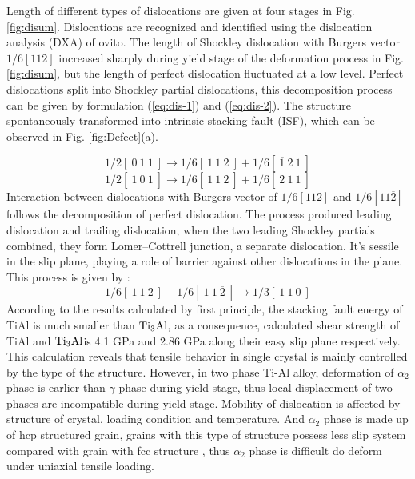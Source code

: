 \documentclass[materials,article,submit,moreauthors,pdftex,10pt,a4paper]{Definitions/mdpi}
\begin{document}
Length of different types of dislocations are given at four stages in Fig. \ref{fig:disum}. Dislocations are recognized and identified using the dislocation analysis (DXA) of ovito. The length of Shockley dislocation with Burgers vector $1/6[1 1 2]$ increased sharply during yield stage of the deformation process in Fig. \ref{fig:disum}, but the length of perfect dislocation fluctuated at a low level. Perfect  dislocations split into Shockley partial dislocations, this decomposition process  can be given by formulation (\ref{eq:dis-1}) and (\ref{eq:dis-2}). The structure spontaneously transformed into intrinsic stacking fault (ISF), which can be observed in Fig. \ref{fig:Defect}(a). 


\begin{equation}\label{eq:dis-1}
1/2 [\ 0\ 1\ 1\ ] \to 1/6[\ 1\ 1\ 2\ ]+1/6[\ \overline{1}\ 2\ 1\ ]
\end{equation}
\begin{equation}\label{eq:dis-2}
1/2 [\ 1\ 0\ \overline{1}\ ] \to 1/6 [\ 1\ 1\ \overline{2}\ ] + 1/6[\ 2\ \overline{1}\ \overline{1}\ ]
\end{equation}
Interaction between dislocations with Burgers vector of $1/6 [112] $ and $ 1/6 [11\overline{2}]$ follows the decomposition of perfect dislocation. The process produced leading dislocation and trailing dislocation, when the two leading Shockley partials combined, they form Lomer–Cottrell junction, a separate dislocation. It's sessile in the slip plane, playing a role of barrier against other dislocations in the plane. This process is given by :
\begin{equation}\label{eq:dis-3}
1/6 [\ 1\ 1\ 2\ ] + 1/6 [\ 1\ 1\  \overline{2}\ ] \to 1/3 [\ 1\ 1\ 0\ ]
\end{equation}
According to the  results calculated by first principle, the stacking fault energy of TiAl is much smaller than $\rm{Ti_3Al}$, as a consequence, calculated shear strength of TiAl and $\rm{Ti_3Al}$is 4.1 GPa and 2.86 GPa along their easy slip plane respectively\cite{Liu2007}. This calculation reveals that tensile behavior in single crystal is mainly controlled by the type of the structure. However, in two phase Ti-Al alloy, deformation of $\alpha_2$ phase is earlier than $\gamma$ phase during yield stage, thus local displacement of two phases are incompatible during yield stage.  Mobility of dislocation is affected by structure of crystal, loading condition and temperature. And $\alpha_2$ phase is made up of hcp  structured grain, grains with this type of structure possess less slip system compared with grain with fcc structure \cite{Zhu2012}, thus $\alpha_2$ phase is difficult do deform under uniaxial tensile loading. 
\end{document}
